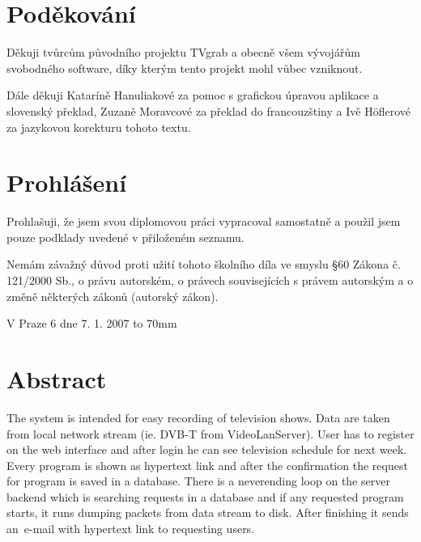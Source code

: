 \documentclass[11pt,twoside,a4paper]{dp_format}%
\begin{document}
\coverpagestarts
\parskip 10pt
\vspace*{\fill}

\cleardoublepage %

\vspace*{\fill}
\chapter*{Poděkování}
Děkuji tvůrcům původního projektu TVgrab a obecně všem vývojářům svobodného software, díky kterým tento projekt mohl vůbec vzniknout.

Dále děkuji Kataríně Hanuliakové za pomoc s grafickou úpravou aplikace a slovenský překlad, Zuzaně Moravcové za překlad do francouzštiny a Ivě Höflerové za jazykovou korekturu tohoto textu.

\cleardoublepage %

\vspace*{\fill}
\chapter*{Prohlášení}
Prohlašuji, že jsem svou diplomovou práci vypracoval samostatně a použil jsem pouze podklady uvedené v přiloženém seznamu.

Nemám závažný důvod proti užití tohoto školního díla ve smyslu \S 60 Zákona č. 121/2000 Sb., o právu autorském, o právech souvisejících s právem autorským a o změně některých zákonů (autorský zákon).

V Praze 6 dne 7. 1. 2007  \hfill \hbox to 70mm{\tiny\dotfill}
 
\cleardoublepage%

\chapter*{Abstract}
The system is intended for easy recording of television shows. Data are taken from local network stream (ie. DVB-T from VideoLanServer). User has to register on the web interface and after login he can see television schedule for next week. Every program is shown as hypertext link and after the confirmation the request for program is saved in a database. There is a neverending loop on the server backend which is searching requests in a database and if any requested program starts, it runs dumping packets from data stream to disk. After finishing it sends an~e-mail with hypertext link to requesting users.
\end{document}
